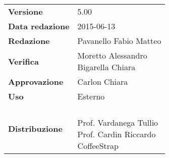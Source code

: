 \documentclass[a4paper]{article}
\begin{document}
			\pagestyle{roman}
			
			\newpage
			

				\begin{center}
					\tabulinesep=6pt
					\begin{tabu} {X[r]|X[l]}
						\textbf{Versione} & 5.00 \\
						\textbf{Data redazione} & 2015-06-13 \\
						\textbf{Redazione} & \parbox[t]{0.4\textwidth}{Pavanello Fabio Matteo} \\
						\textbf{Verifica} & \parbox[t]{0.4\textwidth}{ Moretto Alessandro \\ Bigarella Chiara} \\
						\textbf{Approvazione} & \parbox[t]{0.4\textwidth}{Carlon Chiara} \\
						\textbf{Uso} & Esterno \\
						\textbf{Distribuzione} & \parbox[t]{0.4\textwidth}{\groupname{} \\ Prof. Vardanega Tullio \\ Prof. Cardin Riccardo \\ CoffeeStrap} \\
					\end{tabu}
				\end{center}

	
			\newpage
			
\end{document}
